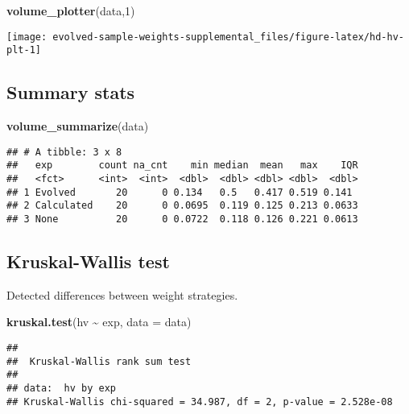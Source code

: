 \documentclass[
]{book}
\newenvironment{Shaded}{\begin{snugshade}}{\end{snugshade}}
\newcommand{\AttributeTok}[1]{\textcolor[rgb]{0.13,0.29,0.53}{#1}}
\newcommand{\DecValTok}[1]{\textcolor[rgb]{0.00,0.00,0.81}{#1}}
\newcommand{\FunctionTok}[1]{\textcolor[rgb]{0.13,0.29,0.53}{\textbf{#1}}}
\newcommand{\NormalTok}[1]{#1}
\newcommand{\SpecialCharTok}[1]{\textcolor[rgb]{0.81,0.36,0.00}{\textbf{#1}}}
\begin{document}
\begin{Shaded}
\begin{Highlighting}[]
\FunctionTok{volume\_plotter}\NormalTok{(data,}\DecValTok{1}\NormalTok{)}
\end{Highlighting}
\end{Shaded}

\texttt{[image: evolved-sample-weights-supplemental\_files/figure-latex/hd-hv-plt-1]}

\hypertarget{summary-stats}{%
\subsection{Summary stats}\label{summary-stats}}

\begin{Shaded}
\begin{Highlighting}[]
\FunctionTok{volume\_summarize}\NormalTok{(data)}
\end{Highlighting}
\end{Shaded}

\begin{verbatim}
## # A tibble: 3 x 8
##   exp        count na_cnt    min median  mean   max    IQR
##   <fct>      <int>  <int>  <dbl>  <dbl> <dbl> <dbl>  <dbl>
## 1 Evolved       20      0 0.134   0.5   0.417 0.519 0.141 
## 2 Calculated    20      0 0.0695  0.119 0.125 0.213 0.0633
## 3 None          20      0 0.0722  0.118 0.126 0.221 0.0613
\end{verbatim}

\hypertarget{kruskal-wallis-test}{%
\subsection{Kruskal-Wallis test}\label{kruskal-wallis-test}}

Detected differences between weight strategies.

\begin{Shaded}
\begin{Highlighting}[]
\FunctionTok{kruskal.test}\NormalTok{(hv }\SpecialCharTok{\textasciitilde{}}\NormalTok{ exp, }\AttributeTok{data =}\NormalTok{ data)}
\end{Highlighting}
\end{Shaded}

\begin{verbatim}
## 
##  Kruskal-Wallis rank sum test
## 
## data:  hv by exp
## Kruskal-Wallis chi-squared = 34.987, df = 2, p-value = 2.528e-08
\end{verbatim}
\end{document}
